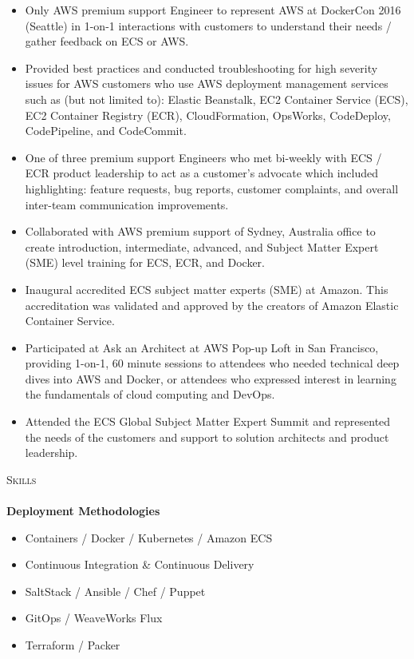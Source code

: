 \documentclass[a4paper]{article}
\newcommand{\lineunder} {
    \vspace*{-8pt} \\
    \hspace*{-18pt} \hrulefill \\
}
\newcommand{\header} [1] {
    {\hspace*{-18pt}\vspace*{6pt} \textsc{#1}}
    \vspace*{-6pt} \lineunder
}
\begin{document}
\begin{itemize} \itemsep 1pt
    \item Only AWS premium support Engineer to represent AWS at DockerCon 2016 (Seattle) in 1-on-1 interactions with customers to understand their needs / gather feedback on ECS or AWS.
    \item Provided best practices and conducted troubleshooting for high severity issues for AWS customers who use AWS deployment management services such as (but not limited to): Elastic Beanstalk, EC2 Container Service (ECS), EC2 Container Registry (ECR), CloudFormation, OpsWorks, CodeDeploy, CodePipeline, and CodeCommit.
    \item One of three premium support Engineers who met bi-weekly with ECS / ECR product leadership to act as a customer's advocate which included highlighting: feature requests, bug reports, customer complaints, and overall inter-team communication improvements.
    \item Collaborated with AWS premium support of Sydney, Australia office to create introduction, intermediate, advanced, and Subject Matter Expert (SME) level training for ECS, ECR, and Docker.
    \item Inaugural accredited ECS subject matter experts (SME) at Amazon. This accreditation was validated and approved by the creators of Amazon Elastic Container Service. 
    \item Participated at \textquotedbl{}Ask an Architect\textquotedbl{} at AWS Pop-up Loft in San Francisco, providing 1-on-1, 60 minute sessions to attendees who needed technical deep dives into AWS and Docker, or attendees who expressed interest in learning the fundamentals of cloud computing and DevOps.
    \item Attended the ECS Global Subject Matter Expert Summit and represented the needs of the customers and support to solution architects and product leadership.
\end{itemize}

\header{Skills}
\textbf{Deployment Methodologies} \\
\vspace{-1mm}
\begin{itemize} \itemsep 1pt
    \item Containers / Docker / Kubernetes / Amazon ECS
    \item Continuous Integration \& Continuous Delivery
    \item SaltStack / Ansible / Chef / Puppet
    \item GitOps / WeaveWorks Flux
    \item Terraform / Packer
\end{itemize}
\end{document}
